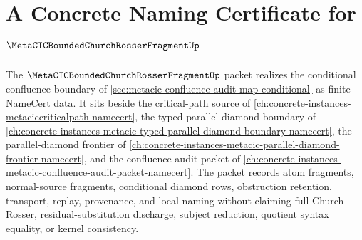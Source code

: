 \chapter{A Concrete Naming Certificate for $\MetaCICBoundedChurchRosserFragmentUp$}
\label{ch:concrete-instances-metacic-bounded-church-rosser-fragment-namecert}

The $\MetaCICBoundedChurchRosserFragmentUp$ packet realizes the conditional confluence boundary of \autoref{sec:metacic-confluence-audit-map-conditional} as finite NameCert data. It sits beside the critical-path source of \autoref{ch:concrete-instances-metaciccriticalpath-namecert}, the typed parallel-diamond boundary of \autoref{ch:concrete-instances-metacic-typed-parallel-diamond-boundary-namecert}, the parallel-diamond frontier of \autoref{ch:concrete-instances-metacic-parallel-diamond-frontier-namecert}, and the confluence audit packet of \autoref{ch:concrete-instances-metacic-confluence-audit-packet-namecert}. The packet records atom fragments, normal-source fragments, conditional diamond rows, obstruction retention, transport, replay, provenance, and local naming without claiming full Church--Rosser, residual-substitution discharge, subject reduction, quotient syntax equality, or kernel consistency.

